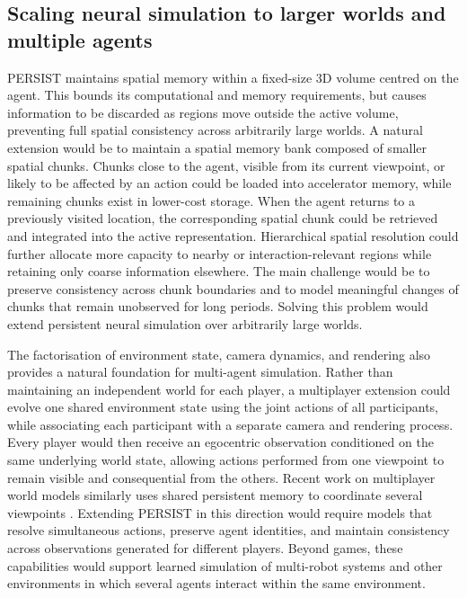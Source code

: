 \subsection{Scaling neural simulation to larger worlds and multiple agents}

PERSIST maintains spatial memory within a fixed-size 3D volume centred on the agent. This bounds its computational and memory requirements, but causes information to be discarded as regions move outside the active volume, preventing full spatial consistency across arbitrarily large worlds. A natural extension would be to maintain a spatial memory bank composed of smaller spatial chunks. Chunks close to the agent, visible from its current viewpoint, or likely to be affected by an action could be loaded into accelerator memory, while remaining chunks exist in lower-cost storage. When the agent returns to a previously visited location, the corresponding spatial chunk could be retrieved and integrated into the active representation. Hierarchical spatial resolution could further allocate more capacity to nearby or interaction-relevant regions while retaining only coarse information elsewhere. The main challenge would be to preserve consistency across chunk boundaries and to model meaningful changes of chunks that remain unobserved for long periods. Solving this problem would extend persistent neural simulation over arbitrarily large worlds.

The factorisation of environment state, camera dynamics, and rendering also provides a natural foundation for multi-agent simulation. Rather than maintaining an independent world for each player, a multiplayer extension could evolve one shared environment state using the joint actions of all participants, while associating each participant with a separate camera and rendering process. Every player would then receive an egocentric observation conditioned on the same underlying world state, allowing actions performed from one viewpoint to remain visible and consequential from the others. Recent work on multiplayer world models similarly uses shared persistent memory to coordinate several viewpoints \citep{po2026multigen}. Extending PERSIST in this direction would require models that resolve simultaneous actions, preserve agent identities, and maintain consistency across observations generated for different players. Beyond games, these capabilities would support learned simulation of multi-robot systems and other environments in which several agents interact within the same environment.

